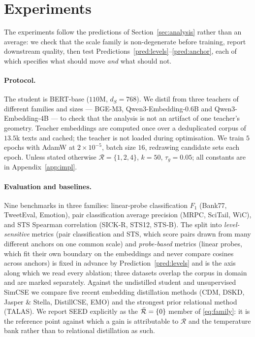 \section{Experiments}
\label{sec:experiments}

The experiments follow the predictions of Section~\ref{sec:analysis} rather than an average:
we check that the scale family is non-degenerate before training, report downstream quality,
then test Predictions~\ref{pred:levels}--\ref{pred:anchor}, each of which specifies what
should move \emph{and} what should not.

\paragraph{Protocol.}
The student is BERT-base ($110$M, $d_S=768$). We distil from three teachers of different
families and sizes --- BGE-M3, Qwen3-Embedding-0.6B and Qwen3-Embedding-4B --- to check that
the analysis is not an artifact of one teacher's geometry. Teacher embeddings are computed
once over a deduplicated corpus of $13.5$k texts and cached; the teacher is not loaded
during optimisation. We train $5$ epochs with AdamW at $2\times10^{-5}$, batch size $16$,
redrawing candidate sets each epoch. Unless stated otherwise $\mathcal{R}=\{1,2,4\}$,
$k=50$, $\tau_g = 0.05$; all constants are in Appendix~\ref{app:impl}.

\paragraph{Evaluation and baselines.}
Nine benchmarks in three families: linear-probe classification $F_1$ (Bank77, TweetEval,
Emotion), pair classification average precision (MRPC, SciTail, WiC), and STS Spearman
correlation (SICK-R, STS12, STS-B). The split into \emph{level-sensitive} metrics (pair
classification and STS, which score pairs drawn from many different anchors on one common
scale) and \emph{probe-based} metrics (linear probes, which fit their own boundary on the
embeddings and never compare cosines across anchors) is fixed in advance by
Prediction~\ref{pred:levels} and is
the axis along which we read every ablation; three datasets overlap the corpus in domain and
are marked separately. Against the undistilled student and unsupervised SimCSE we compare
five recent embedding distillation methods (CDM, DSKD, Jasper \& Stella, DistillCSE, EMO) and
the strongest prior relational method (TALAS). We report SEED \citep{fang2021seed} explicitly
as the $\bar{\mathcal{R}}=\{0\}$ member of \eqref{eq:family}: it is the reference point against which a
gain is attributable to $\mathcal{R}$ and the temperature bank rather than to relational
distillation as such.

